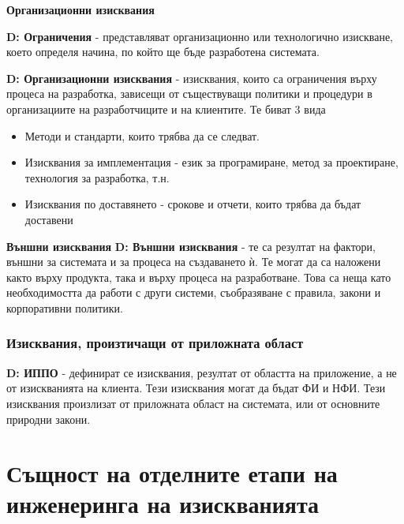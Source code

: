 \documentclass[fleqn,12pt]{article}
\begin{document}
\textbf{Организационни изисквания}

\bigbreak
\textbf{D: Ограничения} - представляват организационно или технологично изискване, което определя начина, по който ще бъде разработена системата.

\bigbreak
\textbf{D: Организационни изисквания} - изисквания, които са ограничения върху процеса на разработка, зависещи от съществуващи политики и процедури в организациите на разработчиците и на клиентите. Те биват 3 вида

\begin{itemize}
	\item Методи и стандарти, които трябва да се следват.
	\item Изисквания за имплементация - език за програмиране, метод за проектиране, технология за разработка, т.н.
	\item Изисквания по доставянето - срокове и отчети, които трябва да бъдат доставени
\end{itemize}

\textbf{Външни изисквания}
\bigbreak
\textbf{D: Външни изисквания} - те са резултат на фактори, външни за системата и за процеса на създаването ѝ. Те могат да са наложени както върху продукта, така и върху процеса на разработване. Това са неща като необходимостта да работи с други системи, съобразяване с правила, закони и корпоративни политики.


\subsubsection{Изисквания, произтичащи от приложната област}
\textbf{D: ИППО} - дефинират се изисквания, резултат от областта на приложение, а не от изискванията на клиента. Тези изисквания могат да бъдат ФИ и НФИ. Тези изисквания произлизат от приложната област на системата, или от основните природни закони.


\section{Същност на отделните етапи на инженеринга на изискванията}
\end{document}
